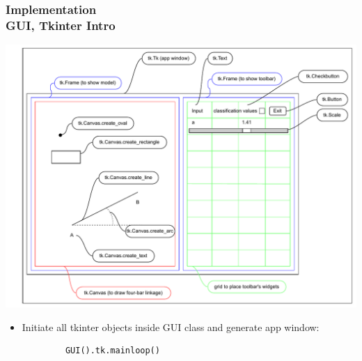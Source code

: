 \documentclass[ucs,10pt]{beamer}
\begin{document}
\begin{frame}[fragile]
\frametitle{Implementation \\
	\small \color{rwth-blue} GUI, Tkinter Intro}
	\begin{center}
		\vspace*{-1mm}
		\includegraphics[width=0.78\linewidth]{./Figures/Implementation/GUI/tkinter_grid.pdf}
		\begin{itemize}
			\item Initiate all tkinter objects inside GUI class and generate app window:
		\end{itemize}
		\begin{lstlisting}
			GUI().tk.mainloop()
		\end{lstlisting}
	\end{center}
\end{frame}
\end{document}
